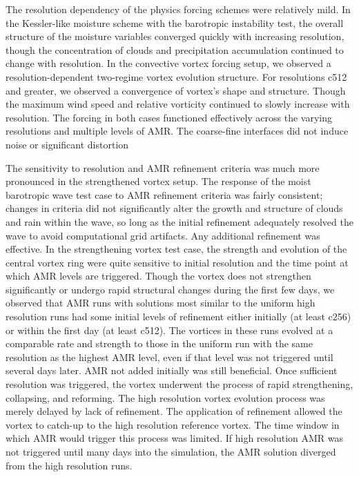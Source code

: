 \documentclass{ametsoc}
\begin{document}
The resolution
dependency of the physics forcing schemes were relatively mild.
In the Kessler-like
moisture scheme with the barotropic instability test, 
the overall structure of the moisture variables converged quickly
with increasing resolution, though the concentration of clouds and
precipitation accumulation continued to change with resolution. In
the convective vortex forcing setup, we observed a resolution-dependent
two-regime vortex evolution structure. For resolutions c512 and greater,
we observed a convergence of vortex's shape and structure. Though
the maximum wind speed and relative
vorticity continued to slowly increase with resolution.
The forcing in both cases functioned effectively across the varying
resolutions and multiple levels of AMR. The coarse-fine interfaces
did not induce noise or significant distortion 

The sensitivity to resolution and AMR refinement criteria was much
more pronounced in the strengthened vortex setup.
The response of the moist barotropic wave test case to 
AMR refinement criteria was fairly consistent; changes in criteria
did not significantly alter the growth and structure of clouds and rain within the wave,
so long as the initial refinement adequately resolved the wave to avoid
computational grid artifacts. Any additional refinement was effective.
In the strengthening vortex test case, the strength and evolution 
of the central vortex ring were quite sensitive to initial resolution and the time point at which
AMR levels are triggered. Though the vortex does not strengthen 
significantly or undergo rapid structural changes during the first few days, 
we observed that AMR runs with solutions most similar to the uniform high
resolution runs had some initial levels of refinement either initially (at least c256) or within
the first day (at least c512). The vortices in these runs evolved at a comparable rate
and strength to those in the uniform run with the same resolution
as the highest AMR level, even if that level was not triggered until several days later.
AMR not added initially was still beneficial.
Once sufficient resolution was triggered, the vortex underwent the process of 
rapid strengthening, collapsing, and reforming. The high resolution vortex evolution process was merely delayed by lack of refinement. 
The application of refinement allowed the vortex to catch-up to the high resolution reference vortex.
The time window in which AMR would trigger this process was limited.
If high resolution AMR was not triggered until many days into the simulation, 
the AMR solution diverged from the high resolution runs.
\end{document}
